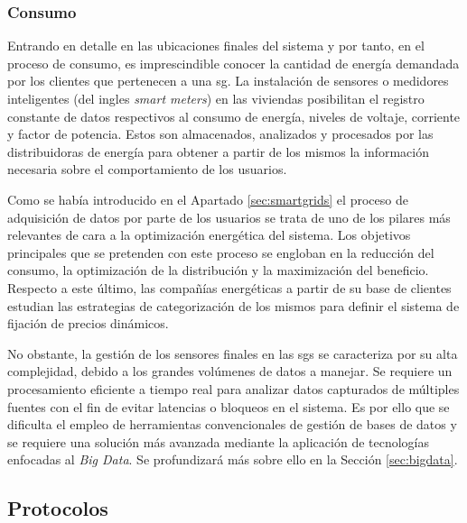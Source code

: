 \subsubsection{Consumo}
\label{sec:consumo}

Entrando en detalle en las ubicaciones finales del sistema y por tanto, en el proceso de consumo, es imprescindible conocer la cantidad de energía demandada por los clientes que pertenecen a una \gls{sg}. La instalación de sensores o medidores inteligentes (del ingles \textit{smart meters}) en las viviendas posibilitan el registro constante de datos respectivos al consumo de energía, niveles de voltaje, corriente y factor de potencia. Estos son almacenados, analizados y procesados por las distribuidoras de energía para obtener a partir de los mismos la información necesaria sobre el comportamiento de los usuarios. \cite{stab}

\vspace{3mm}

Como se había introducido en el Apartado \ref{sec:smartgrids} el proceso de adquisición de datos por parte de los usuarios se trata de uno de los pilares más relevantes de cara a la optimización energética del sistema. Los objetivos principales que se pretenden con este proceso se engloban en la reducción del consumo, la optimización de la distribución y la maximización del beneficio. Respecto a este último, las compañías energéticas a partir de su base de clientes estudian las estrategias de categorización de los mismos para definir el sistema de fijación de precios dinámicos. \cite{stab}

\vspace{3mm}

No obstante, la gestión de los sensores finales en las \gls{sg}s se caracteriza por su alta complejidad, debido a los grandes volúmenes de datos a manejar. Se requiere un procesamiento eficiente a tiempo real para analizar datos capturados de múltiples fuentes con el fin de evitar latencias o bloqueos en el sistema. Es por ello que se dificulta el empleo de herramientas convencionales de gestión de bases de datos y se requiere una solución más avanzada mediante la aplicación de tecnologías enfocadas al \textit{Big Data}. Se profundizará más sobre ello en la Sección \ref{sec:bigdata}.

\vspace{1mm}

\subsection{Protocolos}


